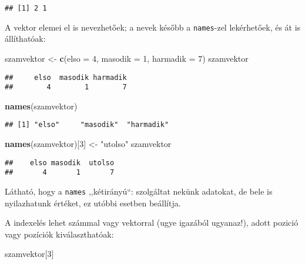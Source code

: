 \documentclass[
]{book}
\newenvironment{Shaded}{\begin{snugshade}}{\end{snugshade}}
\newcommand{\DataTypeTok}[1]{\textcolor[rgb]{0.13,0.29,0.53}{#1}}
\newcommand{\DecValTok}[1]{\textcolor[rgb]{0.00,0.00,0.81}{#1}}
\newcommand{\KeywordTok}[1]{\textcolor[rgb]{0.13,0.29,0.53}{\textbf{#1}}}
\newcommand{\NormalTok}[1]{#1}
\newcommand{\StringTok}[1]{\textcolor[rgb]{0.31,0.60,0.02}{#1}}
\begin{document}
\begin{verbatim}
## [1] 2 1
\end{verbatim}

A vektor elemei el is nevezhetőek; a nevek később a \texttt{names}-zel lekérhetőek, és át is állíthatóak:

\begin{Shaded}
\begin{Highlighting}[]
\NormalTok{szamvektor <-}\StringTok{ }\KeywordTok{c}\NormalTok{(}\DataTypeTok{elso =} \DecValTok{4}\NormalTok{, }\DataTypeTok{masodik =} \DecValTok{1}\NormalTok{, }\DataTypeTok{harmadik =} \DecValTok{7}\NormalTok{)}
\NormalTok{szamvektor}
\end{Highlighting}
\end{Shaded}

\begin{verbatim}
##     elso  masodik harmadik 
##        4        1        7
\end{verbatim}

\begin{Shaded}
\begin{Highlighting}[]
\KeywordTok{names}\NormalTok{(szamvektor)}
\end{Highlighting}
\end{Shaded}

\begin{verbatim}
## [1] "elso"     "masodik"  "harmadik"
\end{verbatim}

\begin{Shaded}
\begin{Highlighting}[]
\KeywordTok{names}\NormalTok{(szamvektor)[}\DecValTok{3}\NormalTok{] <-}\StringTok{ "utolso"}
\NormalTok{szamvektor}
\end{Highlighting}
\end{Shaded}

\begin{verbatim}
##    elso masodik  utolso 
##       4       1       7
\end{verbatim}

Látható, hogy a \texttt{names} ,,kétirányú``: szolgáltat nekünk adatokat, de bele is nyilazhatunk értéket, ez utóbbi esetben beállítja.

A indexelés lehet számmal vagy vektorral (ugye igazából ugyanaz!), adott pozició vagy pozíciók kiválaszthatóak:

\begin{Shaded}
\begin{Highlighting}[]
\NormalTok{szamvektor[}\DecValTok{3}\NormalTok{]}
\end{Highlighting}
\end{Shaded}
\end{document}
